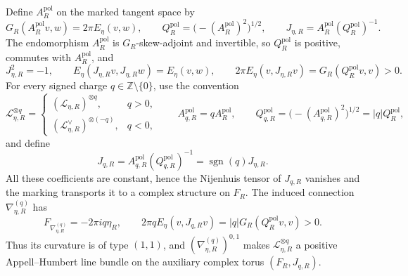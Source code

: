 Define \(A_R^{\mathrm{pol}}\) on the marked tangent space by
\begin{equation}
 G_R(A_R^{\mathrm{pol}}v,w)=2\pi E_\eta(v,w),
 \qquad
 Q_R^{\mathrm{pol}}=\bigl(-(A_R^{\mathrm{pol}})^2\bigr)^{1/2},
 \qquad
 J_{\eta,R}=A_R^{\mathrm{pol}}(Q_R^{\mathrm{pol}})^{-1}.
 \label{cusp-native-full-flux-polar-complex-structure}
\end{equation}
The endomorphism \(A_R^{\mathrm{pol}}\) is \(G_R\)-skew-adjoint and invertible,
so \(Q_R^{\mathrm{pol}}\) is positive, commutes with
\(A_R^{\mathrm{pol}}\), and
\begin{equation}
 J_{\eta,R}^2=-1,
 \qquad
 E_\eta(J_{\eta,R}v,J_{\eta,R}w)=E_\eta(v,w),
 \qquad
 2\pi E_\eta(v,J_{\eta,R}v)
 =G_R(Q_R^{\mathrm{pol}}v,v)>0.
 \label{cusp-native-full-flux-polar-properties}
\end{equation}
For every signed charge \(q\in\mathbb Z\setminus\{0\}\), use the convention
\begin{equation}
 \mathscr L_{\eta,R}^{\otimes q}=
 \begin{cases}
  (\mathscr L_{\eta,R})^{\otimes q},&q>0,\\
  (\mathscr L_{\eta,R}^{\vee})^{\otimes(-q)},&q<0,
 \end{cases}
 \qquad
 A_{q,R}^{\mathrm{pol}}=qA_R^{\mathrm{pol}},
 \qquad
 Q_{q,R}^{\mathrm{pol}}
 =\bigl(-(A_{q,R}^{\mathrm{pol}})^2\bigr)^{1/2}
 =|q|Q_R^{\mathrm{pol}},
 \label{cusp-native-full-flux-signed-charge-bundle}
\end{equation}
and define
\begin{equation}
 J_{q,R}=A_{q,R}^{\mathrm{pol}}(Q_{q,R}^{\mathrm{pol}})^{-1}
 =\operatorname{sgn}(q)J_{\eta,R}.
 \label{cusp-native-full-flux-signed-charge-complex-structure}
\end{equation}
All these coefficients are constant, hence the Nijenhuis tensor of
\(J_{q,R}\) vanishes and the marking transports it to a complex structure on
\(F_R\).  The induced connection \(\nabla_{\eta,R}^{(q)}\) has
\begin{equation}
 F_{\nabla_{\eta,R}^{(q)}}=-2\pi i q\eta_R,
 \qquad
 2\pi qE_\eta(v,J_{q,R}v)
 =|q|G_R(Q_R^{\mathrm{pol}}v,v)>0.
 \label{cusp-native-full-flux-signed-charge-positivity}
\end{equation}
Thus its curvature is of type \((1,1)\), and
\((\nabla_{\eta,R}^{(q)})^{0,1}\) makes
\(\mathscr L_{\eta,R}^{\otimes q}\) a positive Appell--Humbert line bundle on
the auxiliary complex torus \((F_R,J_{q,R})\).

